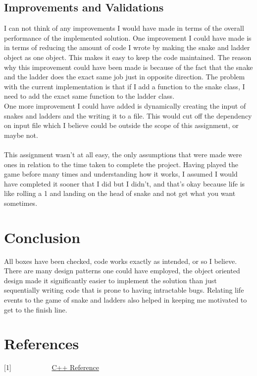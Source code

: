 \subsection*{Improvements and Validations}
I can not think of any improvements I would have made in terms of the overall performance of the implemented solution. One improvement I could have made is in terms of reducing the amount of code I wrote by making the snake and ladder object as one object. This makes it easy to keep the code maintained. The reason why this improvement could have been made is because of the fact that the snake and the ladder does the exact same job just in opposite direction. The problem with the current implementation is that if I add a function to the snake class, I need to add the exact same function to the ladder class.\\
One more improvement I could have added is dynamically creating the input of snakes and ladders and the writing it to a file. This would cut off the dependency on input file which I believe could be outside the scope of this assignment, or maybe not. \\ \\
This assignment wasn't at all easy, the only assumptions that were made were ones in relation to the time taken to complete the project. Having played the game before many times and understanding how it works, I assumed I would have completed it sooner that I did but I didn't, and that's okay because life is like rolling a 1 and landing on the head of snake and not get what you want sometimes. 

\section*{Conclusion}
All boxes have been checked, code works exactly as intended, or so I believe. There are many design patterns one could have employed, the object oriented design made it significantly easier to implement the solution than just sequentially writing code that is prone to having intractable bugs. Relating life events to the game of snake and ladders also helped in keeping me motivated to get to the finish line.

\newpage
\section*{References}

[1] \ \ \ \ \ \ \ \ \ \ \   \href{http://www.cplusplus.com/reference/}{C++ Reference }


